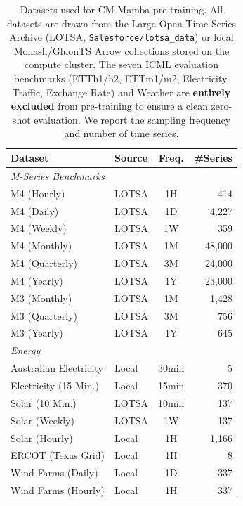 \begin{table}[!ht]
\centering
\caption{Datasets used for CM-Mamba pre-training. All datasets are drawn from the
Large Open Time Series Archive (LOTSA, \texttt{Salesforce/lotsa\_data}) or local
Monash/GluonTS Arrow collections stored on the compute cluster. The seven ICML
evaluation benchmarks (ETTh1/h2, ETTm1/m2, Electricity, Traffic, Exchange Rate)
and Weather are \textbf{entirely excluded} from pre-training to ensure a clean
zero-shot evaluation. We report the sampling frequency and number of time series.}
\label{tab:training_datasets}
\small
\setlength{\tabcolsep}{5pt}
\begin{tabular}{l l c r}
\toprule
\textbf{Dataset} & \textbf{Source} & \textbf{Freq.} & \textbf{\#Series} \\
\midrule

\multicolumn{4}{l}{\textit{M-Series Benchmarks}} \\
\midrule
M4 (Hourly)              & LOTSA & 1H    & 414 \\
M4 (Daily)               & LOTSA & 1D    & 4{,}227 \\
M4 (Weekly)              & LOTSA & 1W    & 359 \\
M4 (Monthly)             & LOTSA & 1M    & 48{,}000 \\
M4 (Quarterly)           & LOTSA & 3M    & 24{,}000 \\
M4 (Yearly)              & LOTSA & 1Y    & 23{,}000 \\
M3 (Monthly)             & LOTSA & 1M    & 1{,}428 \\
M3 (Quarterly)           & LOTSA & 3M    & 756 \\
M3 (Yearly)              & LOTSA & 1Y    & 645 \\
\midrule

\multicolumn{4}{l}{\textit{Energy}} \\
\midrule
Australian Electricity   & Local & 30min & 5 \\
Electricity (15 Min.)    & Local & 15min & 370 \\
Solar (10 Min.)          & LOTSA & 10min & 137 \\
Solar (Weekly)           & LOTSA & 1W    & 137 \\
Solar (Hourly)           & Local & 1H    & 1{,}166 \\
ERCOT (Texas Grid)       & Local & 1H    & 8 \\
Wind Farms (Daily)       & Local & 1D    & 337 \\
Wind Farms (Hourly)      & Local & 1H    & 337 \\
\midrule


\end{tabular}
\end{table}
